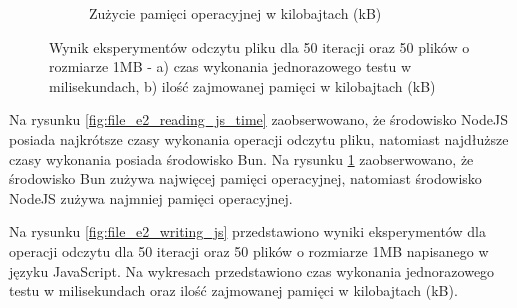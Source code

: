 \begin{figure}[H]
\begin{subfigure}[b]{0.44\textwidth}
    \caption{Zużycie pamięci operacyjnej w kilobajtach (kB)}
    \label{fig:file_e2_reading_js_memory}
  \end{subfigure}
  \hfill
  \caption{Wynik eksperymentów odczytu pliku dla 50 iteracji oraz 50 plików o rozmiarze 1MB - a) czas wykonania jednorazowego testu w milisekundach, b) ilość zajmowanej pamięci w kilobajtach (kB)}
  \label{fig:file_e2_reading_js}
\end{figure}

Na rysunku \ref{fig:file_e2_reading_js_time} zaobserwowano, że środowisko NodeJS posiada najkrótsze czasy wykonania operacji odczytu pliku, natomiast najdłuższe czasy wykonania posiada środowisko Bun. Na rysunku \ref{fig:file_e2_reading_js_memory} zaobserwowano, że środowisko Bun zużywa najwięcej pamięci operacyjnej, natomiast środowisko NodeJS zużywa najmniej pamięci operacyjnej.

Na rysunku \ref{fig:file_e2_writing_js} przedstawiono wyniki eksperymentów dla operacji odczytu dla 50 iteracji oraz 50 plików o rozmiarze 1MB napisanego w języku JavaScript. Na wykresach przedstawiono czas wykonania jednorazowego testu w milisekundach oraz ilość zajmowanej pamięci w kilobajtach (kB).


